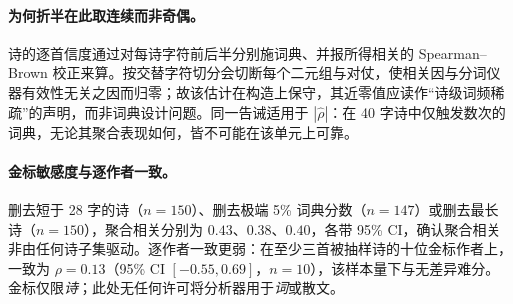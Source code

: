\documentclass[11pt]{article}
\begin{document}
\paragraph{为何折半在此取连续而非奇偶。}
诗的逐首信度通过对每诗字符前后半分别施词典、并报所得相关的 Spearman–Brown 校正来算。按交替字符切分会切断每个二元组与对仗，使相关因与分词仪器有效性无关之因而归零；故该估计在构造上保守，其近零值应读作“诗级词频稀疏”的声明，而非词典设计问题。同一告诫适用于 $|\widehat{\rho}|$：在 40 字诗中仅触发数次的词典，无论其聚合表现如何，皆不可能在该单元上可靠。

\paragraph{金标敏感度与逐作者一致。}
删去短于 28 字的诗（$n{=}150$）、删去极端 5\% 词典分数（$n{=}147$）或删去最长诗（$n{=}150$），聚合相关分别为 $0.43$、$0.38$、$0.40$，各带 95\% CI，确认聚合相关非由任何诗子集驱动。逐作者一致更弱：在至少三首被抽样诗的十位金标作者上，一致为 $\rho{=}0.13$（95\% CI $[-0.55,0.69]$，$n{=}10$），该样本量下与无差异难分。金标仅限\emph{诗}；此处无任何许可将分析器用于\emph{词}或散文。
\end{document}
